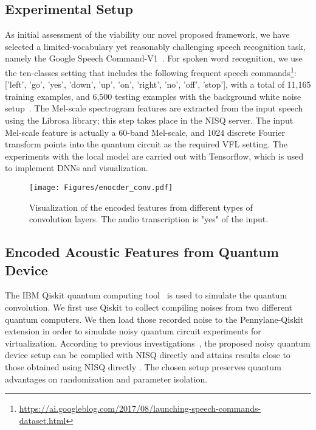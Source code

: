 \documentclass{article}
\begin{document}
\subsection{Experimental Setup}
As initial assessment of the  viability our novel proposed framework, we have selected a limited-vocabulary yet reasonably challenging speech recognition task, namely the Google Speech Command-V1~\cite{warden2018speech}. For spoken word recognition, we use the ten-classes setting that includes the following frequent speech commands\footnote{ \href{https://ai.googleblog.com/2017/08/launching-speech-commands-dataset.html}{https://ai.googleblog.com/2017/08/launching-speech-commands-dataset.html}}: ['left', 'go', 'yes', 'down', 'up', 'on', 'right', 'no', 'off', 'stop'], with a total of 11,165 training examples, and 6,500 testing examples with the background white noise setup~\cite{warden2018speech}. 
The Mel-scale spectrogram features are extracted from the input speech using the Librosa library; this step takes place in the NISQ server. The input Mel-scale feature is actually a 60-band Mel-scale, and 1024 discrete Fourier transform points into the quantum circuit as the required VFL setting. The experiments with the local model are carried out with Tensorflow, which is used  to implement DNNs and visualization.

\begin{figure}[ht!]
\begin{center}
\vspace{-2mm}
  \centering    
\texttt{[image: Figures/enocder\_conv.pdf]}
\end{center}
\vspace{-0.2cm}
  \caption{Visualization of the encoded features from different types of convolution layers. The audio transcription is "yes" of the input.
  } 
\label{fig:2:enc}
\end{figure}
\vspace{-0.4cm}

\subsection{Encoded Acoustic Features from Quantum Device}
The IBM Qiskit quantum computing tool~\cite{aleksandrowicz2019qiskit} is used to simulate the quantum convolution. 
We first use Qiskit to collect compiling noises from two different quantum computers. We then load those recorded noise to the Pennylane-Qiskit extension in order to simulate noisy quantum circuit experiments for virtualization. According to previous investigations~\cite{chen2020quantum, chen2020variational}, the proposed noisy quantum device setup can be complied with  NISQ directly and attains results close to those obtained using NISQ directly
. The chosen setup preserves quantum advantages on randomization and parameter isolation. 
\end{document}

